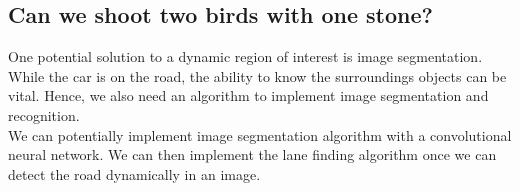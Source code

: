 \documentclass[12pt,twoside]{article}
\begin{document}
\subsection{Can we shoot two birds with one stone?}
One potential solution to a dynamic region of interest is image segmentation. While the car is on the road, the ability to know the surroundings objects can be vital. Hence, we also need an algorithm to implement image segmentation and recognition.\\

We can potentially implement image segmentation algorithm with a convolutional neural network. We can then implement the lane finding algorithm once we can detect the road dynamically in an image. 









%
%
\end{document}

